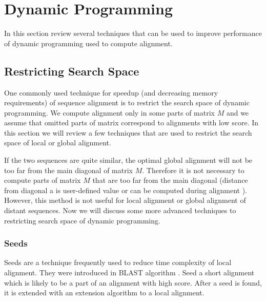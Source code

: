 \section{Dynamic Programming}  


In this section review several techniques that can be used to improve
performance of dynamic programming used to compute alignment.

\subsection{Restricting Search Space}

One commonly used technique for speedup (and decreasing memory requirements) of
sequence alignment is to restrict the search space of dynamic programming. We
compute alignment only in some parts of matrix $M$ and we assume that omitted
parts of matrix correspond to alignments with low score. In this section we will
review a few techniques that are used to restrict the search space of local or
global alignment.

If the two sequences are quite similar, the optimal global alignment will not be
too far from the main diagonal of matrix $M$. Therefore it is not necessary to compute
parts of matrix $M$ that are too far from the main diagonal \cite{Chao1992} (distance from
diagonal a is
user-defined value or can be computed during alignment \cite{GusfieldBook}).
However, this method is not useful for local alignment or global alignment of 
distant sequences. Now we will discuss some more advanced techniques to
restricting search space of dynamic programming.



\subsubsection{Seeds}

Seeds are a technique frequently  used to reduce time complexity of local alignment.  They were
introduced in BLAST algorithm \cite{Altschul1990}.  Seed a short alignment which
is likely to be a part of an alignment with high score. After a seed is
found, it is extended with an extension algorithm to a local alignment.

